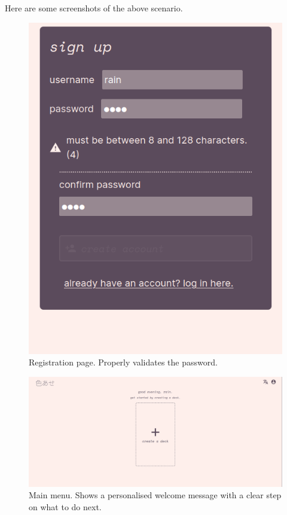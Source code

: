 \documentclass{report}
\begin{document}
Here are some screenshots of the above scenario.

\begin{figure}[H]
  \centering
  \includegraphics[width=\textwidth]{./media/evaluation/sign_up.png}
  \caption{Registration page. Properly validates the password.}
  \label{fig:reg}
\end{figure}

\begin{figure}[H]
  \centering
  \includegraphics[width=\textwidth]{./media/evaluation/decklist1.png}
  \caption{Main menu. Shows a personalised welcome message with a clear step on what to do next.}
  \label{fig:deckist1}
\end{figure}
\end{document}
